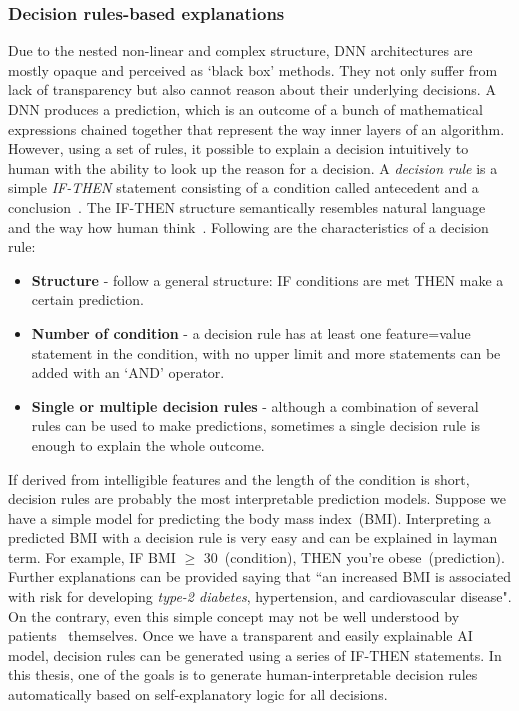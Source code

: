 \subsubsection{Decision rules-based explanations}
Due to the nested non-linear and complex structure, DNN architectures are mostly opaque and perceived as `black box' methods. They not only suffer from lack of transparency but also cannot reason about their underlying decisions. A DNN produces a prediction, which is an outcome of a bunch of mathematical expressions chained together that represent the way inner layers of an algorithm. However, using a set of rules, it possible to explain a decision intuitively to human with the ability to look up the reason for a decision. A \textit{decision rule} is a simple \textit{IF-THEN} statement consisting of a condition called antecedent and a conclusion~\cite{molnar2019interpretable}. The IF-THEN structure semantically resembles natural language and the way how human think~\cite{molnar2019interpretable}. Following are the characteristics of a decision rule: 

\begin{itemize}[noitemsep]
    \item \textbf{Structure} - follow a general structure: IF conditions are met THEN make a certain prediction. 
    \item \textbf{Number of condition} - a decision rule has at least one feature=value statement in the condition, with no upper limit and more statements can be added with an ‘AND’ operator. 
    \item \textbf{Single or multiple decision rules} - although a combination of several rules can be used to make predictions, sometimes a single decision rule is enough to explain the whole outcome.
\end{itemize}

\hspace*{3.5mm} If derived from intelligible features and the length of the condition is short, decision rules are probably the most interpretable prediction models. Suppose we have a simple model for predicting the body mass index~(BMI). Interpreting a predicted BMI with a decision rule is very easy and can be explained in layman term. For example, IF BMI $\geq$ 30~(condition), THEN you're obese~(prediction). Further explanations can be provided saying that ``an increased BMI is associated with risk for developing \textit{type-2 diabetes}, hypertension, and cardiovascular disease". 
On the contrary, even this simple concept may not be well understood by patients~\cite{post2015patient} themselves. Once we have a transparent and easily explainable AI model, decision rules can be generated using a series of IF-THEN statements. In this thesis, one of the goals is to generate human-interpretable decision rules automatically based on self-explanatory logic for all decisions. 

